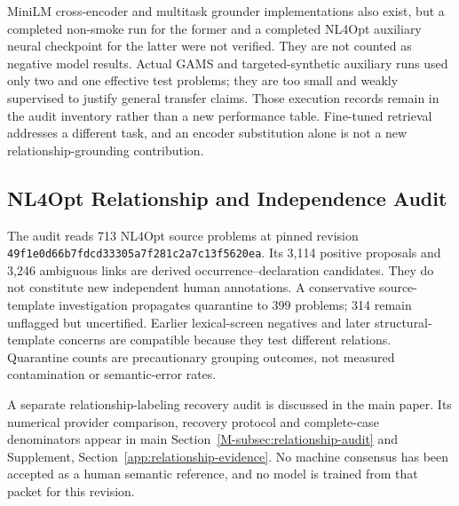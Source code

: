 MiniLM cross-encoder and multitask grounder implementations also exist, but a completed non-smoke run for the former and a completed NL4Opt auxiliary neural checkpoint for the latter were not verified. They are not counted as negative model results. Actual GAMS and targeted-synthetic auxiliary runs used only two and one effective test problems; they are too small and weakly supervised to justify general transfer claims. Those execution records remain in the audit inventory rather than a new performance table. Fine-tuned retrieval addresses a different task, and an encoder substitution alone is not a new relationship-grounding contribution.

\subsection{NL4Opt Relationship and Independence Audit}
\label{app:nl4opt-audit}

The audit reads 713 NL4Opt source problems at pinned revision \texttt{49f1e0d66b7fdcd33305a7f281c2a7c13f5620ea}. Its 3,114 positive proposals and 3,246 ambiguous links are derived occurrence--declaration candidates. They do not constitute new independent human annotations. A conservative source-template investigation propagates quarantine to 399 problems; 314 remain unflagged but uncertified. Earlier lexical-screen negatives and later structural-template concerns are compatible because they test different relations. Quarantine counts are precautionary grouping outcomes, not measured contamination or semantic-error rates.

A separate relationship-labeling recovery audit is discussed in the main paper. Its numerical provider comparison, recovery protocol and complete-case denominators appear in main Section~\ref{M-subsec:relationship-audit} and Supplement, Section~\ref{app:relationship-evidence}. No machine consensus has been accepted as a human semantic reference, and no model is trained from that packet for this revision.

